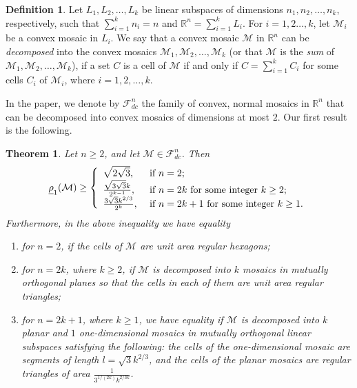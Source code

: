 \documentclass[twoside]{amsart}
\newtheorem{thm}{Theorem}
\theoremstyle{definition}
\newtheorem{defn}{Definition}
\renewcommand{\Re}{\mathbb R}
\newcommand{\M}{\mathcal{M}}
\newcommand{\F}{\mathcal{F}}
\begin{document}
\begin{defn}\label{defn:decomposable}
Let $L_1, L_2, \ldots, L_k$ be linear subspaces of dimensions $n_1, n_2, \ldots, n_k$, respectively, such that $\sum_{i=1}^k n_i = n$ and $\Re^n = \sum_{i=1}^k L_i$.
For $i=1,2\ldots, k$, let $\M_i$ be a convex mosaic in $L_i$. We say that a convex mosaic $\M$ in $\Re^n$ can be \emph{decomposed} into the convex mosaics $\M_1, \M_2, \ldots, \M_k$ (or that $\M$ is the \emph{sum} of $\M_1, \M_2, \ldots, \M_k$), if a set $C$ is a cell of $\M$ if and only if $C= \sum_{i=1}^k C_i$ for some cells $C_i$ of $\M_i$, where $i=1,2, \ldots, k$.
\end{defn}

In the paper, we denote by $\F_{dc}^n$ the family of convex, normal mosaics in $\Re^n$ that can be decomposed into convex mosaics of dimensions at most $2$. Our first result is the following.

\begin{thm}\label{thm:decomp}
Let $n \geq 2$, and let $\M \in \F_{dc}^n$. Then
\begin{equation}
\underline{\rho}_1(\M) \geq
\left\{
\begin{array}{ll}
\sqrt{2 \sqrt{3}}, & \hbox{ if } n=2;\\
\frac{ \sqrt{3 \sqrt{3}} k}{2^{k-1}}, & \hbox{ if } n=2k \hbox{ for some integer } k \geq 2;\\
\frac{3\sqrt{3} k^{2/3}}{2^k}, & \hbox{ if } n=2k+1 \hbox{ for some integer } k \geq 1. 
\end{array}
\right.
\end{equation}
Furthermore, in the above inequality we have equality
\begin{enumerate}
\item[(i)] for $n=2$, if the cells of $\M$ are unit area regular hexagons;
\item[(ii)] for $n=2k$, where $k \geq 2$, if $\M$ is decomposed into $k$ mosaics in mutually orthogonal planes so that the cells in each of them are unit area regular triangles;
\item[(iii)] for $n=2k+1$, where $k \geq 1$, we have equality if $\M$ is decomposed into $k$ planar and $1$ one-dimensional mosaics in mutually orthogonal linear subspaces satisfying the following: the cells of the one-dimensional mosaic are segments of length $l=\sqrt{3}k^{2/3}$, and the cells of the planar mosaics are regular triangles of area $\frac{1}{ 3^{1/(2k)} k^{2/3k}}$.
\end{enumerate}
\end{thm}
\end{document}
